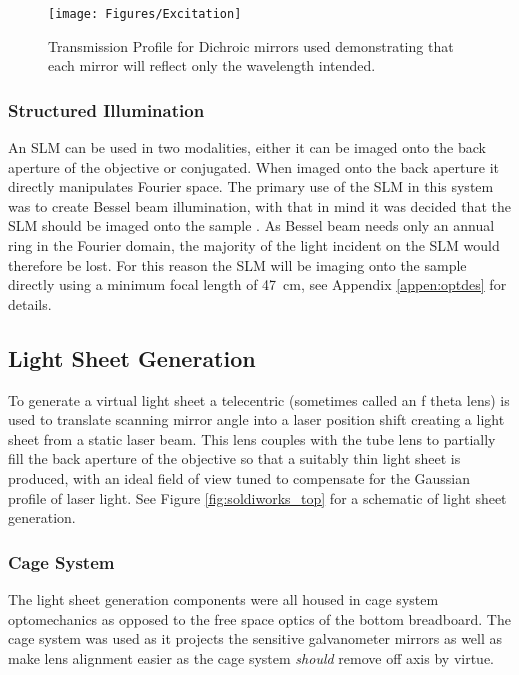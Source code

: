 \documentclass[10pt,a4paper]{report}
\begin{document}
\begin{spacing}{1.5}
\begin{figure}
\centering
\texttt{[image: Figures/Excitation]}
\caption[Dichroic transmission profiles]{Transmission Profile for Dichroic mirrors used demonstrating that each mirror will reflect only the wavelength intended.}
\label{fig:Excitation}
\end{figure}

\subsubsection{Structured Illumination}

An SLM can be used in two modalities, either it can be imaged onto the back aperture of the objective or conjugated. When imaged onto the back aperture it directly manipulates Fourier space. The primary use of the SLM in this system was to create Bessel beam illumination, with that in mind it was decided that the SLM should be imaged  onto the sample \cite{Fahrbach2010e}. As Bessel beam needs only an annual ring in the Fourier domain, the majority of the light incident on the SLM would therefore be lost. For this reason the SLM will be imaging onto the sample directly using a minimum focal length of \SI{47}{\centi\meter}, see Appendix \ref{appen:optdes} for details.

\subsection{Light Sheet Generation}
To generate a virtual light sheet a telecentric (sometimes called an f theta lens) is used to translate scanning mirror angle into a laser position shift creating a light sheet from a static laser beam. This lens couples with the tube lens to partially fill the back aperture of the objective so that a suitably thin light sheet is produced, with an ideal field of view tuned to compensate for the Gaussian profile of laser light. See Figure \ref{fig:soldiworks_top} for a schematic of light sheet generation.

\subsubsection{Cage System}

The light sheet generation components were all housed in cage system optomechanics as opposed to the free space optics of the bottom breadboard. The cage system was used as it projects the sensitive galvanometer mirrors as well as make lens alignment easier as the cage system \textit{should} remove off axis by virtue.


\end{spacing}
\end{document}
